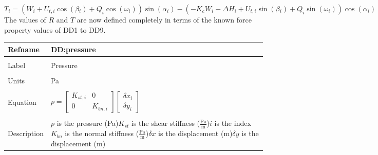 \documentclass[12pt]{article}
\begin{document}
\begin{dmath}
T_{i}=\left(W_{i}+{U_{t,i}} \cos\left(\beta{}_{i}\right)+Q_{i} \cos\left(\omega{}_{i}\right)\right) \sin\left(\alpha{}_{i}\right)-\left(-{K_{c}} W_{i}-{\Delta{}H}_{i}+{U_{t,i}} \sin\left(\beta{}_{i}\right)+Q_{i} \sin\left(\omega{}_{i}\right)\right) \cos\left(\alpha{}_{i}\right)
\end{dmath}
The values of $R$ and $T$ are now defined completely in terms of the known force property values of DD1 to DD9.
~\newline
\noindent \begin{minipage}{\textwidth}
\begin{tabular}{p{} p{}}
\toprule \textbf{Refname} & \textbf{DD:pressure}
\label{DD:pressure}
\\ \midrule \\
Label & Pressure
\\ \midrule \\
Units & Pa
\\ \midrule \\
Equation & $p=\begin{bmatrix}
{K_{st,i}} & 0\\
0 & {K_{bn,i}}
\end{bmatrix} \begin{bmatrix}
{\delta{}x}_{i}\\
{\delta{}y}_{i}
\end{bmatrix}$
\\ \midrule \\
Description & $p$ is the pressure (Pa)\newline${K_{st}}$ is the shear stiffness ($\frac{\text{Pa}}{\text{m}}$)\newline$i$ is the index\newline${K_{bn}}$ is the normal stiffness ($\frac{\text{Pa}}{\text{m}}$)\newline$\delta{}x$ is the displacement (m)\newline$\delta{}y$ is the displacement (m)
\\ \bottomrule \end{tabular}
\end{minipage}\\
~\newline
\end{document}
